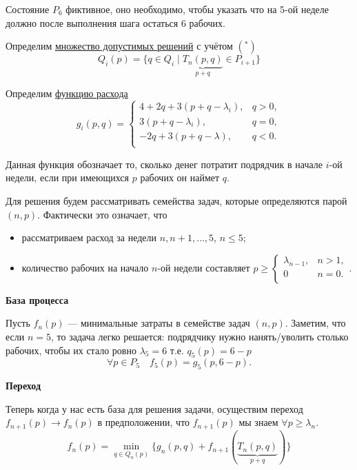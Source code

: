 Состояние $P_6$ фиктивное, оно необходимо, чтобы указать что на 5-ой неделе должно после выполнения шага остаться 6 рабочих. 

\bigskip

Определим \underline{множество допустимых решений} с учётом $(^*)$ 
\[Q_i(p) = \{q \in Q_i \; \big| \; \underbrace{T_n(p, q)}_{p + q} \in P_{i + 1} \}\]
\bigskip

Определим \underline{функцию расхода}
\[g_i(p,q) = \begin{cases}
	4 + 2q + 3(p + q - \lambda_i),& q > 0, \\
	3(p + q - \lambda_i),& q = 0, \\
	-2q + 3(p + q - \lambda),& q < 0. \\
\end{cases}\]

Данная функция обозначает то, сколько денег потратит подрядчик в начале $i$-ой недели, если при имеющихся $p$ рабочих он наймет $q$. 

\bigskip

Для решения будем рассматривать семейства задач, которые определяются парой $(n, p)$. Фактически это означает, что

\begin{itemize}[nosep]
	\item рассматриваем расход за недели $n, n+1, \dots, 5$, $n \le 5$;
	
	\item количество рабочих на начало $n$-ой недели составляет $p \ge \begin{cases}
		\lambda_{n - 1},& n > 1, \\
		 0& n = 0. \\
	\end{cases}$.
\end{itemize}

\bigskip

\textbf{База процесса}

Пусть $f_n(p)$ --- минимальные затраты в семействе задач $(n, p)$. Заметим, что если $n = 5$, то задача легко решается: подрядчику нужно нанять/уволить столько рабочих, чтобы их стало ровно $\lambda_5 = 6$ т.е. $q_5(p) = 6 - p$
\[
\forall p \in P_5 \quad f_5(p) = g_5(p, 6 - p).
\]


\bigskip

\textbf{Переход}

Теперь когда у нас есть база для решения задачи, осуществим переход $f_{n+1}(p) \to f_n(p)$ в предположении, что $f_{n+1}(p)$ мы знаем $\forall p \ge \lambda_{n}$.
\[
\boxed{f_n(p) = \min_{q \in Q_n(p)} \Big\{ g_n(p, q) + f_{n + 1}(\underbrace{T_n(p, q)}_{p + q}) \Big\}}\tag{**}
\]

